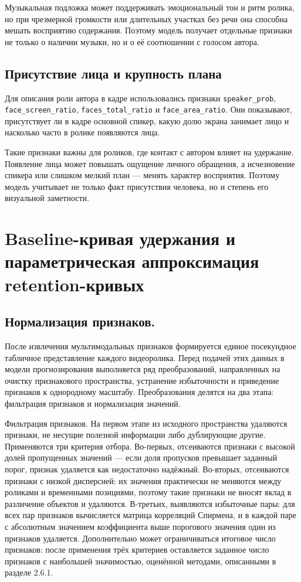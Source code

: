 \documentclass[times]{itmo-student-thesis}
\begin{document}
Музыкальная подложка может поддерживать эмоциональный тон и ритм ролика, но при чрезмерной громкости или длительных участках без речи она способна мешать восприятию содержания. Поэтому модель получает отдельные признаки не только о наличии музыки, но и о её соотношении с голосом автора.

\subsection{Присутствие лица и крупность плана}

Для описания роли автора в кадре использовались признаки \texttt{speaker\_prob}, \texttt{face\_screen\_ratio}, \texttt{faces\_total\_ratio} и \texttt{face\_area\_ratio}. Они показывают, присутствует ли в кадре основной спикер, какую долю экрана занимает лицо и насколько часто в ролике появляются лица.

Такие признаки важны для роликов, где контакт с автором влияет на удержание. Появление лица может повышать ощущение личного обращения, а исчезновение спикера или слишком мелкий план — менять характер восприятия. Поэтому модель учитывает не только факт присутствия человека, но и степень его визуальной заметности.

\section{Baseline-кривая удержания и параметрическая аппроксимация retention-кривых}

\subsection{Нормализация признаков.}

После извлечения мультимодальных признаков формируется единое посекундное табличное представление каждого видеоролика. Перед подачей этих данных в модели прогнозирования выполняется ряд преобразований, направленных на очистку признакового пространства, устранение избыточности и приведение признаков к однородному масштабу. Преобразования делятся на два этапа: фильтрация признаков и нормализация значений.

Фильтрация признаков. На первом этапе из исходного пространства удаляются признаки, не несущие полезной информации либо дублирующие другие. Применяются три критерия отбора. Во-первых, отсеиваются признаки с высокой долей пропущенных значений — если доля пропусков превышает заданный порог, признак удаляется как недостаточно надёжный. Во-вторых, отсеиваются признаки с низкой дисперсией: их значения практически не меняются между роликами и временными позициями, поэтому такие признаки не вносят вклад в различение объектов и удаляются. В-третьих, выявляются избыточные пары: для всех пар признаков вычисляется матрица корреляций Спирмена, и в каждой паре с абсолютным значением коэффициента выше порогового значения один из признаков удаляется. Дополнительно может ограничиваться итоговое число признаков: после применения трёх критериев оставляется заданное число признаков с наибольшей значимостью, оценённой методами, описанными в разделе 2.6.1.
\end{document}
